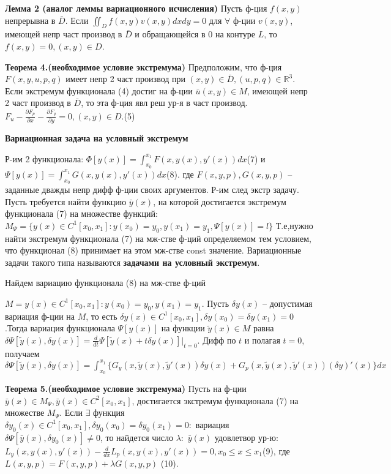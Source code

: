 \textbf{Лемма 2 (аналог леммы вариационного исчисления)}
    Пусть ф-ция $f(x, y)$ непрерывна в $\bar D$. Если
    $\iint_D f(x,y)v(x,y)dxdy=0$
    для $\forall$ ф-ции $v(x, y)$, имеющей непр част производ в $\bar D$ и обращающейся в 0 на контуре $L$, то $f(x, y) = 0, (x, y) \in D$.



\textbf{Теорема 4.(необходимое условие экстремума)}
    Предположим, что ф-ция $F(x, y, u, p, q)$ имеет
    непр 2 част производ при $(x, y) \in \bar D, (u, p, q) \in \mathbb{R}^3$.
    Если экстремум функционала (4) достиг на ф-ции $\bar u(x, y) \in M$, имеющей непр 2 част производ в $\bar D$, то эта ф-ция явл реш ур-я в част производ.$F_u-\frac{\partial F_p}{\partial x}-\frac{\partial F_q}{\partial y}=0, (x,y)\in D.$(5)

\textbf{Вариационная задача на условный экстремум}

Р-им 2 функционала: $\Phi[y(x)]=\int_{x_0}^{x_1} F(x,y(x),y'(x))dx$(7) и $\Psi[y(x)]=\int_{x_0}^{x_1} G(x,y(x),y'(x))dx$(8).
где $F(x, y, p), G(x, y, p)$ – заданные дважды непр дифф ф-ции своих аргументов.
Р-им след экстр задачу. Пусть требуется найти функцию $\bar y(x)$, на которой достигается экстремум функционала (7) на множестве функций:
$M_\Psi=\{y(x)\in C^1[x_0, x_1] : y(x_0) = y_0, y(x_1) = y_1, \Psi[y(x)]=l\}$
Т.е,нужно найти экстремум функционала (7) на
мж-стве ф-ций определяемом тем условием, что функционал (8)
принимает на этом мж-стве const значение. Вариационные задачи такого типа называются \textbf{задачами на условный экстремум}.

Найдем вариацию функционала (8) на мж-стве ф-ций 

$M = {y(x) \in C^1[x_0, x_1] : y(x_0) = y_0, y(x_1) = y_1}$.
Пусть $\delta y(x)$ – допустимая вариация ф-ции на $M$, то есть $\delta y(x) \in C^1[x_0, x_1], \delta y(x_0) = \delta y(x_1) = 0$.Тогда вариация функционала $\Psi [y(x)]$ на функции $\widetilde y(x)\in M$ равна $\delta \Psi[\widetilde y(x), \delta y(x)]=\frac{d}{dt}\Psi[\widetilde y(x) + t\delta y(x)]\Big|_{t=0}$. Дифф по $t$ и полагая $t = 0$, получаем 
$\delta\Psi[\widetilde y(x), \delta y(x)]= \int_{x_0}^{x_1}\Big\{G_y(x, \widetilde y(x), \widetilde y'(x))\delta y(x) + G_p(x, \widetilde y(x), \widetilde y'(x))(\delta y)'(x) \Big\}dx$

\textbf{Теорема 5.(необходимое условие экстремума)}
    Пусть на ф-ции $\bar y(x) \in M_\Psi, \bar y(x) \in C^2[x_0, x_1]$,
    достигается экстремум функционала (7) на множестве $M_\Psi$. Если
    $\exists$ функция $\delta y_0(x) \in C^1[x_0, x_1], \delta y_0(x_0) = \delta y_0(x_1) = 0:$ вариация $\delta\Psi[\bar y(x), \delta y_0(x)] \neq 0$, то найдется число $\lambda:$ $\bar y(x)$ удовлетвор ур-ю: $L_y(x, y(x), y'(x))-\frac{d}{dx}L_p(x, y(x), y'(x))=0, x_0 \leq x \leq x_1$(9), где $L(x, y, p) = F(x, y, p) + \lambda G(x, y, p)$ (10).
